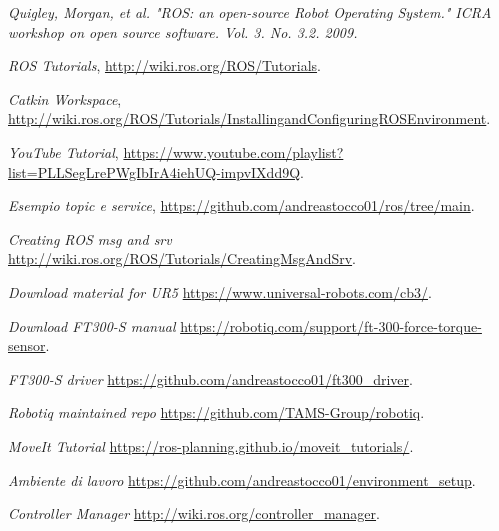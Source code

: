 \begin{thebibliography}{99}

 \textit{Quigley, Morgan, et al. "ROS: an open-source Robot Operating System." ICRA workshop on open source software. 
Vol. 3. No. 3.2. 2009.}

 \textit{ROS Tutorials}, \url{http://wiki.ros.org/ROS/Tutorials}.

 \textit{Catkin Workspace}, \url{http://wiki.ros.org/ROS/Tutorials/InstallingandConfiguringROSEnvironment}.

 \textit{YouTube Tutorial}, \url{https://www.youtube.com/playlist?list=PLLSegLrePWgIbIrA4iehUQ-impvIXdd9Q}.

 \textit{Esempio topic e service}, \url{https://github.com/andreastocco01/ros/tree/main}.

 \textit{Creating ROS msg and srv} \url{http://wiki.ros.org/ROS/Tutorials/CreatingMsgAndSrv}.

 \textit{Download material for UR5} \url{https://www.universal-robots.com/cb3/}.

 \textit{Download FT300-S manual} \url{https://robotiq.com/support/ft-300-force-torque-sensor}.

 \textit{FT300-S driver} \url{https://github.com/andreastocco01/ft300_driver}.

 \textit{Robotiq maintained repo} \url{https://github.com/TAMS-Group/robotiq}.

 \textit{MoveIt Tutorial} \url{https://ros-planning.github.io/moveit_tutorials/}.

 \textit{Ambiente di lavoro} \url{https://github.com/andreastocco01/environment_setup}.

 \textit{Controller Manager} \url{http://wiki.ros.org/controller_manager}.
\end{thebibliography}